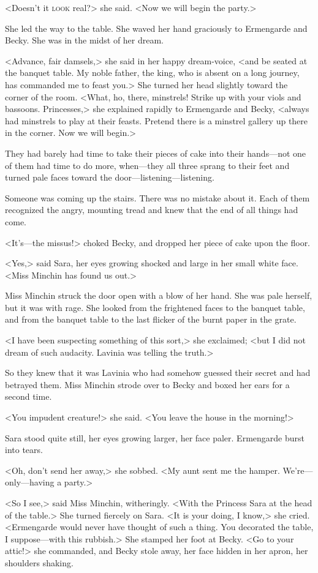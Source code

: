 <Doesn't it \textsc{look} real?> she said. <Now we will begin the party.>

She led the way to the table. She waved her hand graciously to Ermengarde and Becky. She was in the midst of her dream.

<Advance, fair damsels,> she said in her happy dream-voice, <and be seated at the banquet table. My noble father, the king, who is absent on a long journey, has commanded me to feast you.> She turned her head slightly toward the corner of the room. <What, ho, there, minstrels! Strike up with your viols and bassoons. Princesses,> she explained rapidly to Ermengarde and Becky, <always had minstrels to play at their feasts. Pretend there is a minstrel gallery up there in the corner. Now we will begin.>

They had barely had time to take their pieces of cake into their hands—not one of them had time to do more, when—they all three sprang to their feet and turned pale faces toward the door—listening—listening.

Someone was coming up the stairs. There was no mistake about it. Each of them recognized the angry, mounting tread and knew that the end of all things had come.

<It's—the missus!> choked Becky, and dropped her piece of cake upon the floor.

<Yes,> said Sara, her eyes growing shocked and large in her small white face. <Miss Minchin has found us out.>

Miss Minchin struck the door open with a blow of her hand. She was pale herself, but it was with rage. She looked from the frightened faces to the banquet table, and from the banquet table to the last flicker of the burnt paper in the grate.

<I have been suspecting something of this sort,> she exclaimed; <but I did not dream of such audacity. Lavinia was telling the truth.>

So they knew that it was Lavinia who had somehow guessed their secret and had betrayed them. Miss Minchin strode over to Becky and boxed her ears for a second time.

<You impudent creature!> she said. <You leave the house in the morning!>

Sara stood quite still, her eyes growing larger, her face paler. Ermengarde burst into tears.

<Oh, don't send her away,> she sobbed. <My aunt sent me the hamper. We're—only—having a party.>

<So I see,> said Miss Minchin, witheringly. <With the Princess Sara at the head of the table.> She turned fiercely on Sara. <It is your doing, I know,> she cried. <Ermengarde would never have thought of such a thing. You decorated the table, I suppose—with this rubbish.> She stamped her foot at Becky. <Go to your attic!> she commanded, and Becky stole away, her face hidden in her apron, her shoulders shaking.

